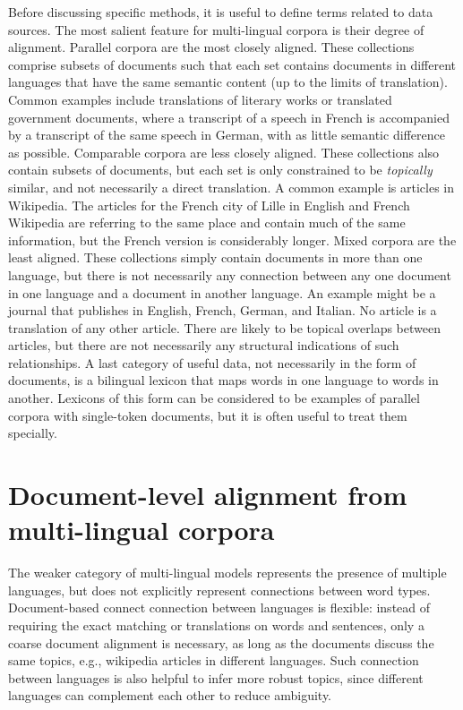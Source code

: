 Before discussing specific methods, it is useful to define terms related to data sources.
The most salient feature for multi-lingual corpora is their degree of alignment.
Parallel corpora are the most closely aligned. These collections comprise subsets of documents such that each set contains documents in different languages that have the same semantic content (up to the limits of translation).
Common examples include translations of literary works or translated government documents, where a transcript of a speech in French is accompanied by a transcript of the  same speech in German, with as little semantic difference as possible.
Comparable corpora are less closely aligned. 
These collections also contain subsets of documents, but each set is only constrained to be {\em topically} similar, and not necessarily a direct translation.
A common example is articles in Wikipedia.
The articles for the French city of Lille in English and French Wikipedia are referring to the same place and contain much of the same information, but the French version is considerably longer.
Mixed corpora are the least aligned. These collections simply contain documents in more than one language, but there is not necessarily any connection between any one document in one language and a document in another language.
An example might be a journal that publishes in English, French, German, and Italian.
No article is a translation of any other article.
There are likely to be topical overlaps between articles, but there are not necessarily any structural indications of such relationships.
A last category of useful data, not necessarily in the form of documents, is a bilingual lexicon that maps words in one language to words in another.
Lexicons of this form can be considered to be examples of parallel corpora with single-token documents, but it is often useful to treat them specially.

\section{Document-level alignment from multi-lingual corpora}

The weaker category of multi-lingual models represents the presence of multiple languages, but does not explicitly represent connections between word types.
Document-based connect connection between languages is flexible: instead of requiring
the exact matching or translations on words and sentences, only a
coarse document alignment is necessary, as long as the documents
discuss the same topics, e.g., wikipedia articles in different
languages. Such connection between languages is also helpful to infer
more robust topics, since different languages can complement each
other to reduce ambiguity.

